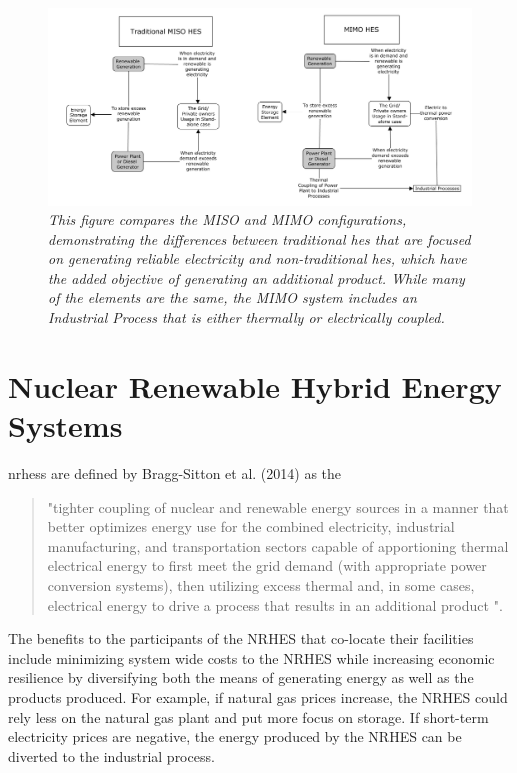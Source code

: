 \begin{figure}
\includegraphics[width=\textwidth]{MISO_MIMO.png}
\caption{\small \sl This figure compares the MISO and MIMO configurations, demonstrating the differences between traditional \ac{hes} that are focused on generating reliable electricity and non-traditional \ac{hes}, which have the added objective of generating an additional product.  While many of the elements are the same, the MIMO system includes an Industrial Process  that is either thermally or electrically coupled.}
\label{MIMO_MISO}
\end{figure}

\section{Nuclear Renewable Hybrid Energy Systems}
\ac{nrhess} are defined by Bragg-Sitton et al. (2014) as the

\begin{quotation}
"tighter coupling of nuclear and renewable energy sources in a manner that better optimizes energy use for the combined electricity, industrial manufacturing, and transportation sectors capable of apportioning thermal electrical energy to first meet the grid demand (with appropriate power conversion systems), then utilizing excess thermal and, in some cases, electrical energy to drive a process that results in an additional product \cite {Bragg-Sitton2014}".
\end{quotation} The benefits to the participants of the NRHES that co-locate their facilities include minimizing system wide costs to the NRHES while increasing economic resilience by diversifying both the means of generating energy as well as the products produced. For example, if natural gas prices increase, the NRHES could rely less on the natural gas plant and put more focus on storage.  If short-term electricity prices are negative, the energy produced by the NRHES can be diverted to the industrial process.

